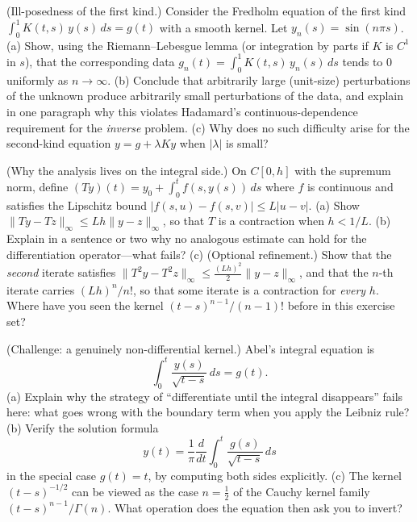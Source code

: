 \documentclass{essay}
\begin{document}
\begin{exercise}\label{ex:illposed}
(Ill-posedness of the first kind.) Consider the Fredholm equation of the first kind $\int_0^1 K(t,s)\, y(s)\, ds = g(t)$ with a smooth kernel. Let $y_n(s) = \sin(n\pi s)$. (a) Show, using the Riemann--Lebesgue lemma (or integration by parts if $K$ is $C^1$ in $s$), that the corresponding data $g_n(t) = \int_0^1 K(t,s)\, y_n(s)\, ds$ tends to $0$ uniformly as $n \to \infty$. (b) Conclude that arbitrarily large (unit-size) perturbations of the unknown produce arbitrarily small perturbations of the data, and explain in one paragraph why this violates Hadamard's continuous-dependence requirement for the \emph{inverse} problem. (c) Why does no such difficulty arise for the second-kind equation $y = g + \lambda K y$ when $|\lambda|$ is small?
\end{exercise}

\begin{exercise}\label{ex:contraction}
(Why the analysis lives on the integral side.) On $C[0, h]$ with the supremum norm, define $(Ty)(t) = y_0 + \int_0^t f(s, y(s))\,ds$ where $f$ is continuous and satisfies the Lipschitz bound $|f(s, u) - f(s, v)| \le L|u - v|$. (a) Show $\|Ty - Tz\|_\infty \le Lh \|y - z\|_\infty$, so that $T$ is a contraction when $h < 1/L$. (b) Explain in a sentence or two why no analogous estimate can hold for the differentiation operator---what fails? (c) (Optional refinement.) Show that the \emph{second} iterate satisfies $\|T^2 y - T^2 z\|_\infty \le \frac{(Lh)^2}{2}\|y - z\|_\infty$, and that the $n$-th iterate carries $(Lh)^n/n!$, so that some iterate is a contraction for \emph{every} $h$. Where have you seen the kernel $(t-s)^{n-1}/(n-1)!$ before in this exercise set?
\end{exercise}

\begin{exercise}\label{ex:abel}
(Challenge: a genuinely non-differential kernel.) Abel's integral equation is
\[
\int_0^t \frac{y(s)}{\sqrt{t - s}}\, ds = g(t).
\]
(a) Explain why the strategy of ``differentiate until the integral disappears'' fails here: what goes wrong with the boundary term when you apply the Leibniz rule? (b) Verify the solution formula
\[
y(t) = \frac{1}{\pi} \frac{d}{dt} \int_0^t \frac{g(s)}{\sqrt{t - s}}\, ds
\]
in the special case $g(t) = t$, by computing both sides explicitly. (c) The kernel $(t-s)^{-1/2}$ can be viewed as the case $n = \tfrac12$ of the Cauchy kernel family $(t-s)^{n-1}/\Gamma(n)$. What operation does the equation then ask you to invert?
\end{exercise}
\end{document}
